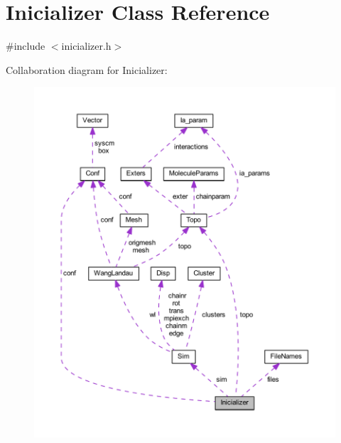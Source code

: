 \hypertarget{class_inicializer}{\section{Inicializer Class Reference}
\label{class_inicializer}
}


{\ttfamily \#include $<$inicializer.\+h$>$}



Collaboration diagram for Inicializer\+:\nopagebreak
\begin{figure}[H]
\begin{center}
\leavevmode
\includegraphics[width=350pt]{class_inicializer__coll__graph}
\end{center}
\end{figure}
